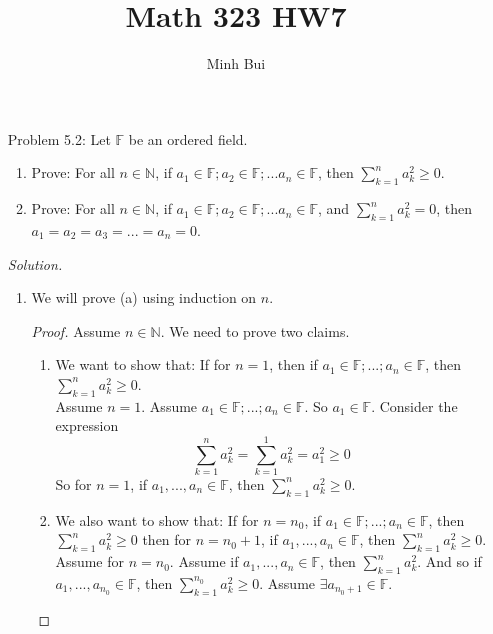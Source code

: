 \documentclass{article}
\author{Minh Bui}
\title{Math 323 HW7}
\theoremstyle{claim}
\theoremstyle{definition}
\begin{document}
\maketitle
\begin{enumerate}
    \item[Problem 5.2:] Let $\mathbb{F}$ be an ordered field.
        \begin{enumerate}
            \item Prove: For all $n \in \mathbb{N}$, if $a_1 \in \mathbb{F}; a_2 \in \mathbb{F}; ... a_n \in \mathbb{F}$, then $\sum\limits_{k=1}^n a_k^2 \ge 0$.
            \item Prove: For all $n \in \mathbb{N}$, if $a_1 \in \mathbb{F}; a_2 \in \mathbb{F}; ... a_n \in \mathbb{F}$, and $\sum\limits_{k=1}^n a_k^2 = 0$, then $a_1 = a_2 = a_3 = ... = a_n = 0$.
        \end{enumerate}
    \item[] \emph{Solution.}
        \begin{enumerate}
            \item We will prove (a) using induction on $n$.
                \begin{proof}
                    Assume $n \in \mathbb{N}$. We need to prove two claims.
                    \begin{enumerate}
                        \item We want to show that: If for $n = 1$, then if $a_1 \in \mathbb{F}; ... ;a_n \in \mathbb{F}$, then $\sum\limits_{k=1}^n a_k^2 \ge 0$.\\
                        Assume $n = 1$. Assume $a_1 \in \mathbb{F}; ...; a_n \in \mathbb{F}$. So $a_1 \in \mathbb{F}$. Consider the expression 
                        \begin{equation*}
                            \sum\limits_{k=1}^n a_k^2 = \sum\limits_{k=1}^1 a_k^2 = a_1^2 \ge 0
                        \end{equation*}
                        So for $n = 1$, if $a_1,...,a_n \in \mathbb{F}$, then $\sum\limits_{k=1}^n a_k^2 \ge 0$.
                    \item We also want to show that: If for $n = n_0$, if $a_1 \in \mathbb{F}; ... ; a_n \in \mathbb{F}$, then $\sum\limits_{k=1}^n a_k^2 \ge 0$ then for $n = n_0 + 1$, if $a_1, ..., a_n \in \mathbb{F}$, then $\sum\limits_{k=1}^n a_k^2 \ge 0$.\\
                        Assume for $n = n_0$. Assume if $a_1, ..., a_n \in \mathbb{F}$, then  $\sum\limits_{k=1}^n a_k^2$. And so if $a_1, ..., a_{n_0} \in \mathbb{F}$, then $\sum\limits_{k=1}^{n_0} a_k^2 \ge 0$. Assume $\exists a_{n_0 + 1} \in \mathbb{F}$.\\ 

\end{enumerate}
\end{proof}
\end{enumerate}
\end{enumerate}
\end{document}
